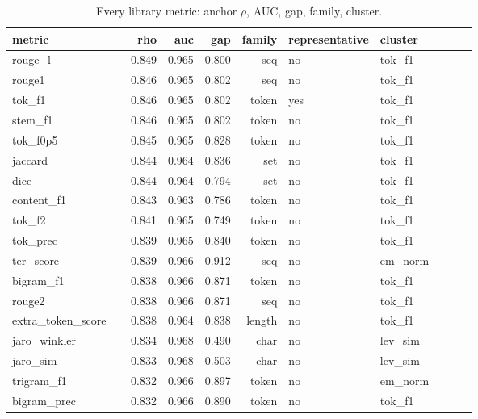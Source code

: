 \tiny
\setlength{\tabcolsep}{3pt}
\begin{longtable}{p{0.278\linewidth}rrrrp{0.134\linewidth}p{0.259\linewidth}}
\caption{Every library metric: anchor $\rho$, AUC, gap, family, cluster.}\label{tab:metric_table}\\
\toprule
metric & rho & auc & gap & family & representative & cluster \\
\midrule
rouge\_\allowbreak{}l & 0.849 & 0.965 & 0.800 & seq & no & tok\_\allowbreak{}f1 \\
rouge1 & 0.846 & 0.965 & 0.802 & seq & no & tok\_\allowbreak{}f1 \\
tok\_\allowbreak{}f1 & 0.846 & 0.965 & 0.802 & token & yes & tok\_\allowbreak{}f1 \\
stem\_\allowbreak{}f1 & 0.846 & 0.965 & 0.802 & token & no & tok\_\allowbreak{}f1 \\
tok\_\allowbreak{}f0p5 & 0.845 & 0.965 & 0.828 & token & no & tok\_\allowbreak{}f1 \\
jaccard & 0.844 & 0.964 & 0.836 & set & no & tok\_\allowbreak{}f1 \\
dice & 0.844 & 0.964 & 0.794 & set & no & tok\_\allowbreak{}f1 \\
content\_\allowbreak{}f1 & 0.843 & 0.963 & 0.786 & token & no & tok\_\allowbreak{}f1 \\
tok\_\allowbreak{}f2 & 0.841 & 0.965 & 0.749 & token & no & tok\_\allowbreak{}f1 \\
tok\_\allowbreak{}prec & 0.839 & 0.965 & 0.840 & token & no & tok\_\allowbreak{}f1 \\
ter\_\allowbreak{}score & 0.839 & 0.966 & 0.912 & seq & no & em\_\allowbreak{}norm \\
bigram\_\allowbreak{}f1 & 0.838 & 0.966 & 0.871 & token & no & tok\_\allowbreak{}f1 \\
rouge2 & 0.838 & 0.966 & 0.871 & seq & no & tok\_\allowbreak{}f1 \\
extra\_\allowbreak{}token\_\allowbreak{}score & 0.838 & 0.964 & 0.838 & length & no & tok\_\allowbreak{}f1 \\
jaro\_\allowbreak{}winkler & 0.834 & 0.968 & 0.490 & char & no & lev\_\allowbreak{}sim \\
jaro\_\allowbreak{}sim & 0.833 & 0.968 & 0.503 & char & no & lev\_\allowbreak{}sim \\
trigram\_\allowbreak{}f1 & 0.832 & 0.966 & 0.897 & token & no & em\_\allowbreak{}norm \\
bigram\_\allowbreak{}prec & 0.832 & 0.966 & 0.890 & token & no & tok\_\allowbreak{}f1 \\

\end{longtable}
